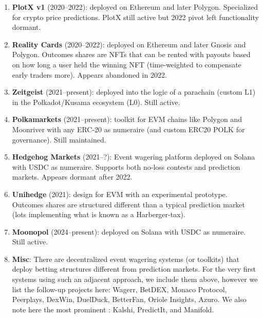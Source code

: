 \begin{enumerate}
\item \textbf{PlotX v1} (2020--2022): \depm deployed on Ethereum and later Polygon. Specialized for crypto price predictions. PlotX still active but 2022 pivot left \depm functionality dormant. 

\item \textbf{Reality Cards} (2020--2022): \depm deployed on Ethereum and later Gnosis and Polygon. Outcomes shares are NFTs that can be rented with payouts based on how long a user held the winning NFT (time-weighted to compensate early traders more). Appears abandoned in 2022.

\item \textbf{Zeitgeist} (2021--present): \depm deployed into the logic of a parachain (custom L1) in the Polkadot/Kusama ecosystem (L0). Still active.

\item \textbf{Polkamarkets} (2021--present): \depm toolkit for EVM chains like Polygon and Moonriver with any ERC-20 as numeraire (and custom ERC20 POLK for governance). Still maintained.

\item \textbf{Hedgehog Markets} (2021--?): Event wagering platform deployed on Solana with USDC as numeraire. Supports both no-loss contests and prediction markets. Appears dormant after 2022.

\item \textbf{Unihedge} (2021): \depm design for EVM with an experimental prototype. Outcomes shares are structured different than a typical prediction market (lots implementing what is known as a Harberger-tax).

\item \textbf{Moonopol} (2024--present): \depm deployed on Solana with USDC as numeraire. Still active.

\item \textbf{Misc}: There are decentralized event wagering systems (or toolkits) that deploy betting structures different from prediction markets. For the very first systems using such an adjacent approach, we include them above, however we list the follow-up projects here: Wagerr, BetDEX, Monaco Protocol, Peerplays, DexWin, DuelDuck, BetterFan, Oriole Insights, Azuro. We also note here the most prominent \cepms: Kalshi, PredictIt, and Manifold. 

\end{enumerate}














